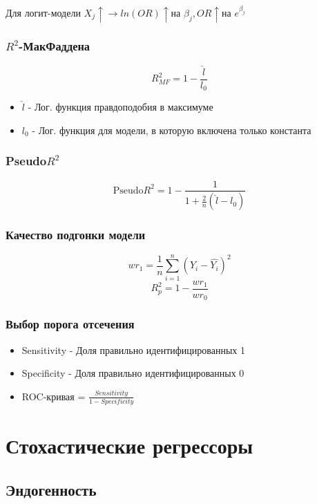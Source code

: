 \documentclass[a4paper, 12pt]{article}
\begin{document}
Для логит-модели $X_{j} \uparrow \rightarrow ln(OR)\uparrow \textrm{на } \beta_{j}, OR\uparrow \textrm{на } e^{\beta_{j}}$
\newline

\subsubsection{$R^{2}$-МакФаддена}

\[R^{2}_{MF} = 1 - \frac{\hat{l}}{l_{0}}\]
\begin{itemize}
    \item $\hat{l}$ - Лог. функция правдоподобия в максимуме
    \item  $l_{0}$ - Лог. функция для модели, в которую включена только константа
\end{itemize}

\subsubsection{Pseudo$R^{2}$}

\[\textrm{Pseudo}R^{2} = 1 - \frac{1}{1 + \frac{2}{n}(\hat{l} - l_{0})}\]

\subsubsection{Качество подгонки модели}

\[wr_{1} = \frac{1}{n}\sum_{i = 1}^{n}(Y_{i} - \hat{Y_{i}})^{2}\]
\[R^{2}_{p} = 1 - \frac{wr_{1}}{wr_{0}}\]

\subsubsection{Выбор порога отсечения}

\begin{itemize}
    \item Sensitivity - Доля правильно идентифицированных 1
    \item Specificity - Доля правильно идентифицированных 0
    \item ROC-кривая = $\frac{Sensitivity}{1 - Specificity}$
\end{itemize}

\section{Стохастические регрессоры}

\subsection{Эндогенность}
\end{document}
